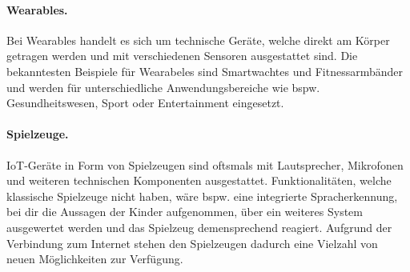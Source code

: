\paragraph{Wearables.}
Bei Wearables handelt es sich um technische Geräte, welche direkt am Körper getragen werden und mit verschiedenen 
Sensoren ausgestattet sind. Die bekanntesten Beispiele für Wearabeles sind Smartwachtes und Fitnessarmbänder und 
werden für unterschiedliche Anwendungsbereiche wie bspw. Gesundheitswesen, Sport oder Entertainment eingesetzt. \cite{paper}

\paragraph{Spielzeuge.}
IoT-Geräte in Form von Spielzeugen sind oftsmals mit Lautsprecher, Mikrofonen und weiteren technischen Komponenten ausgestattet.
Funktionalitäten, welche klassische Spielzeuge nicht haben, wäre bspw. eine integrierte
Spracherkennung, bei dir die Aussagen der Kinder aufgenommen, über ein weiteres System ausgewertet werden und das Spielzeug
demensprechend reagiert. Aufgrund der Verbindung zum Internet stehen den Spielzeugen dadurch eine Vielzahl von neuen Möglichkeiten
zur Verfügung. \cite{paper}
